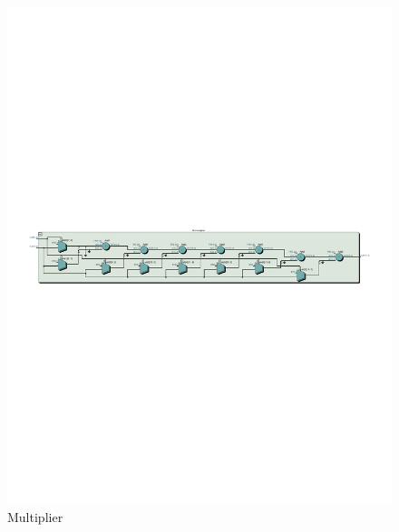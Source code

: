 \documentclass[13pt,a4paper]{report}
\begin{document}
\begin{figure}[H]
\centering
\includegraphics[scale=0.85, clip, trim={0cm 12.3cm 0cm 12.62cm}]{images/Exc3_Mul_RTL.pdf}
\caption*{Multiplier}
\end{figure}
\end{document}
